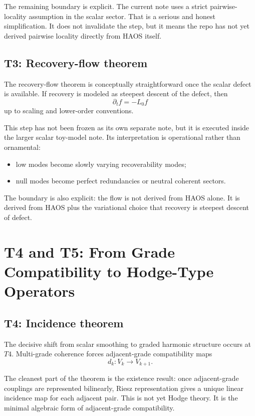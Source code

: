 \documentclass[11pt]{article}
\begin{document}
The remaining boundary is explicit. The current note uses a strict pairwise-locality assumption in the scalar sector. That is a serious and honest simplification. It does not invalidate the step, but it means the repo has not yet derived pairwise locality directly from HAOS itself.

\subsection{T3: Recovery-flow theorem}

The recovery-flow theorem is conceptually straightforward once the scalar defect is available. If recovery is modeled as steepest descent of the defect, then
\[
\partial_t f = -L_0 f
\]
up to scaling and lower-order conventions.

This step has not been frozen as its own separate note, but it is executed inside the larger scalar toy-model note. Its interpretation is operational rather than ornamental:
\begin{itemize}
\item low modes become slowly varying recoverability modes;
\item null modes become perfect redundancies or neutral coherent sectors.
\end{itemize}

The boundary is also explicit: the flow is not derived from HAOS alone. It is derived from HAOS plus the variational choice that recovery is steepest descent of defect.

\section{T4 and T5: From Grade Compatibility to Hodge-Type Operators}

\subsection{T4: Incidence theorem}

The decisive shift from scalar smoothing to graded harmonic structure occurs at $T4$. Multi-grade coherence forces adjacent-grade compatibility maps
\[
d_k : V_k \to V_{k+1}.
\]

The cleanest part of the theorem is the existence result: once adjacent-grade couplings are represented bilinearly, Riesz representation gives a unique linear incidence map for each adjacent pair. This is not yet Hodge theory. It is the minimal algebraic form of adjacent-grade compatibility.
\end{document}

